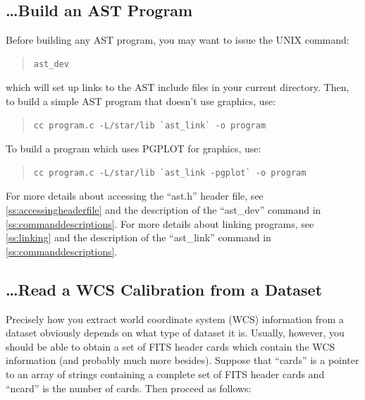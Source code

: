 \documentclass[twoside,11pt]{article}
\newcommand{\htmlref}[2]{#1}
\newcommand{\appref}[1]{Appendix~\ref{#1}}
\newcommand{\secref}[1]{\S\ref{#1}}
\renewcommand{\appref}[1]{\ref{#1}}
\renewcommand{\secref}[1]{\ref{#1}}
\begin{document}
\subsection{\label{ss:howtobuild}\ldots Build an AST Program}

Before building any AST program, you may want to issue the UNIX command:

\begin{quote}
\small
\begin{verbatim}
ast_dev
\end{verbatim}
\normalsize
\end{quote}

which will set up links to the AST include files in your current
directory.  Then, to build a simple AST program that doesn't use
graphics, use:

\begin{quote}
\small
\begin{verbatim}
cc program.c -L/star/lib `ast_link` -o program
\end{verbatim}
\normalsize
\end{quote}

To build a program which uses PGPLOT for graphics, use:

\begin{quote}
\small
\begin{verbatim}
cc program.c -L/star/lib `ast_link -pgplot` -o program
\end{verbatim}
\normalsize
\end{quote}

For more details about accessing the ``ast.h'' header file, see
\secref{ss:accessingheaderfile} and the description of the
``\htmlref{ast\_dev}{ast_dev}'' command in \appref{ss:commanddescriptions}.  For more
details about linking programs, see \secref{ss:linking} and the
description of the ``\htmlref{ast\_link}{ast_link}'' command in
\appref{ss:commanddescriptions}.

\subsection{\label{ss:howtoreadwcs}\ldots Read a WCS Calibration from a Dataset}

Precisely how you extract world coordinate system (WCS) information
from a dataset obviously depends on what type of dataset it
is. Usually, however, you should be able to obtain a set of FITS
header cards which contain the WCS information (and probably much more
besides). Suppose that ``cards'' is a pointer to an array of strings
containing a complete set of FITS header cards and ``ncard'' is the
number of cards. Then proceed as follows:
\end{document}
